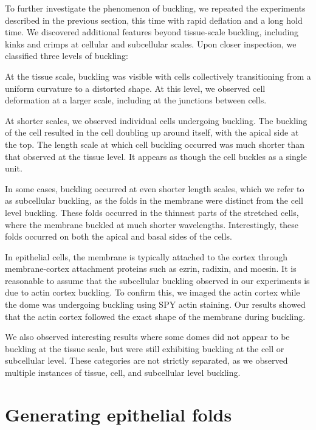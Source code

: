 To further investigate the phenomenon of buckling, we repeated the
experiments described in the previous section, this time with rapid
deflation and a long hold time. We discovered additional features beyond
tissue-scale buckling, including kinks and crimps at cellular and
subcellular scales. Upon closer inspection, we classified three levels
of buckling:

At the tissue scale, buckling was visible with cells collectively
transitioning from a uniform curvature to a distorted shape. At this
level, we observed cell deformation at a larger scale, including at the
junctions between cells.

At shorter scales, we observed individual cells undergoing buckling. The
buckling of the cell resulted in the cell doubling up around itself,
with the apical side at the top. The length scale at which cell buckling
occurred was much shorter than that observed at the tissue level. It
appears as though the cell buckles as a single unit.

In some cases, buckling occurred at even shorter length scales, which we
refer to as subcellular buckling, as the folds in the membrane were
distinct from the cell level buckling. These folds occurred in the
thinnest parts of the stretched cells, where the membrane buckled at
much shorter wavelengths. Interestingly, these folds occurred on both
the apical and basal sides of the cells.

In epithelial cells, the membrane is typically attached to the cortex
through membrane-cortex attachment proteins such as ezrin, radixin, and
moesin. It is reasonable to assume that the subcellular buckling
observed in our experiments is due to actin cortex buckling. To confirm
this, we imaged the actin cortex while the dome was undergoing buckling
using SPY actin staining. Our results showed that the actin cortex
followed the exact shape of the membrane during buckling.

We also observed interesting results where some domes did not appear to
be buckling at the tissue scale, but were still exhibiting buckling at
the cell or subcellular level. These categories are not strictly
separated, as we observed multiple instances of tissue, cell, and
subcellular level buckling.

\hypertarget{generating-epithelial-folds}{%
	\section{Generating epithelial
		folds}\label{generating-epithelial-folds}}

